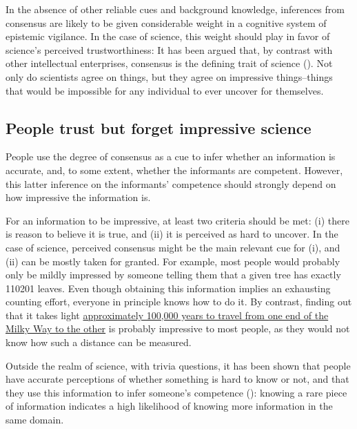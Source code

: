 \documentclass[
  jou,
  floatsintext,
  longtable,
  nolmodern,
  notxfonts,
  notimes,
  colorlinks=true,linkcolor=blue,citecolor=blue,urlcolor=blue]{apa7}
\begin{document}
In the absence of other reliable cues and background knowledge,
inferences from consensus are likely to be given considerable weight in
a cognitive system of epistemic vigilance. In the case of science, this
weight should play in favor of science's perceived trustworthiness: It
has been argued that, by contrast with other intellectual enterprises,
consensus is the defining trait of science
().
Not only do scientists agree on things, but they agree on impressive
things--things that would be impossible for any individual to ever
uncover for themselves.

\subsection{People trust but forget impressive
science}\label{people-trust-but-forget-impressive-science}

People use the degree of consensus as a cue to infer whether an
information is accurate, and, to some extent, whether the informants are
competent. However, this latter inference on the informants' competence
should strongly depend on how impressive the information is.

For an information to be impressive, at least two criteria should be
met: (i) there is reason to believe it is true, and (ii) it is perceived
as hard to uncover. In the case of science, perceived consensus might be
the main relevant cue for (i), and (ii) can be mostly taken for granted.
For example, most people would probably only be mildly impressed by
someone telling them that a given tree has exactly 110201 leaves. Even
though obtaining this information implies an exhausting counting effort,
everyone in principle knows how to do it. By contrast, finding out that
it takes light
\href{https://imagine.gsfc.nasa.gov/features/cosmic/milkyway_info.html}{approximately
100,000 years to travel from one end of the Milky Way to the other} is
probably impressive to most people, as they would not know how such a
distance can be measured.

Outside the realm of science, with trivia questions, it has been shown
that people have accurate perceptions of whether something is hard to
know or not, and that they use this information to infer someone's
competence (): knowing a rare piece of information indicates a high
likelihood of knowing more information in the same domain.
\end{document}
